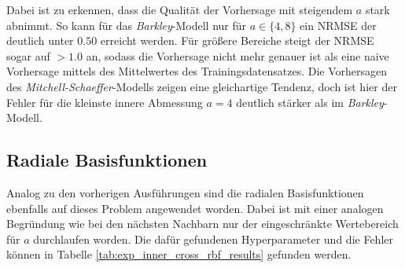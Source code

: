 Dabei ist zu erkennen, dass die Qualität der Vorhersage mit steigendem $a$ stark abnimmt. So kann für das \textit{Barkley}-Modell nur für $a \in \{4,8\}$ ein NRMSE der deutlich unter $0.50$ erreicht werden. Für größere Bereiche steigt der NRMSE sogar auf $> 1.0$ an, sodass die Vorhersage nicht mehr genauer ist als eine naive Vorhersage mittels des Mittelwertes des Trainingsdatensatzes. Die Vorhersagen des \textit{Mitchell-Schaeffer}-Modells zeigen eine gleichartige Tendenz, doch ist hier der Fehler für die kleinste innere Abmessung $a=4$ deutlich stärker als im \textit{Barkley}-Modell.

\FloatBarrier
\subsection{Radiale Basisfunktionen}
Analog zu den vorherigen Ausführungen sind die radialen Basisfunktionen ebenfalls auf dieses Problem angewendet worden. Dabei ist mit einer analogen Begründung wie bei den nächsten Nachbarn nur der eingeschränkte Wertebereich für $a$ durchlaufen worden. Die dafür gefundenen Hyperparameter und die Fehler können in Tabelle \ref{tab:exp_inner_cross_rbf_results} gefunden werden.
